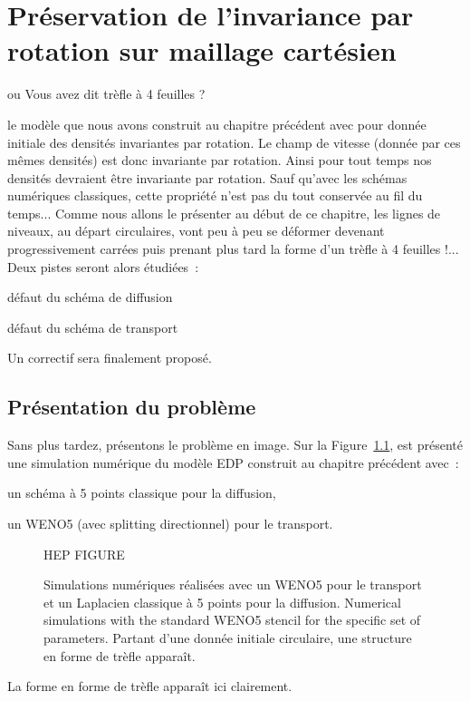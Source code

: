 \documentclass[main.tex]{subfiles}
\begin{document}
\chapter{Préservation de l'invariance par rotation sur maillage cartésien}
\vspace{-13mm}
\begin{flushright}
{ \Large\sf ou Vous avez dit trèfle à 4 feuilles ?\ }
\end{flushright}
%

 le modèle que nous avons construit au chapitre précédent avec pour donnée initiale des densités invariantes par rotation. Le champ de vitesse (donnée par ces mêmes densités) est donc invariante par rotation. Ainsi pour tout temps nos densités devraient être invariante par rotation. Sauf qu'avec les schémas numériques classiques, cette propriété n'est pas du tout conservée au fil du temps... Comme nous allons le présenter au début de ce chapitre, les lignes de niveaux, au départ circulaires, vont peu à peu se déformer devenant progressivement carrées puis prenant plus tard la forme d'un trèfle à 4 feuilles !... Deux pistes seront alors étudiées~:
\begin{myitemize}
\item défaut du schéma de diffusion
\item défaut du schéma de transport
\end{myitemize}


\noindent Un correctif sera finalement proposé. 

\section{Présentation du problème}
Sans plus tardez, présentons le problème en image. Sur la Figure~\ref{fig:trefle}, est présenté une simulation numérique du modèle EDP construit au chapitre précédent avec~:
\begin{myitemize}
\item un schéma à 5 points classique pour la diffusion,
\item un WENO5 (avec splitting directionnel) pour le transport.
\end{myitemize}
\begin{figure}
\centering
HEP FIGURE
\caption{\label{fig:trefle} Simulations numériques réalisées avec un WENO5 pour le transport et un Laplacien classique à 5 points pour la diffusion. Numerical simulations with the standard WENO5 stencil for the
specific set of parameters. Partant d'une donnée initiale circulaire, 
une structure en forme de trèfle apparaît.}
\end{figure}
La forme en forme de trèfle apparaît ici clairement. 
\end{document}
